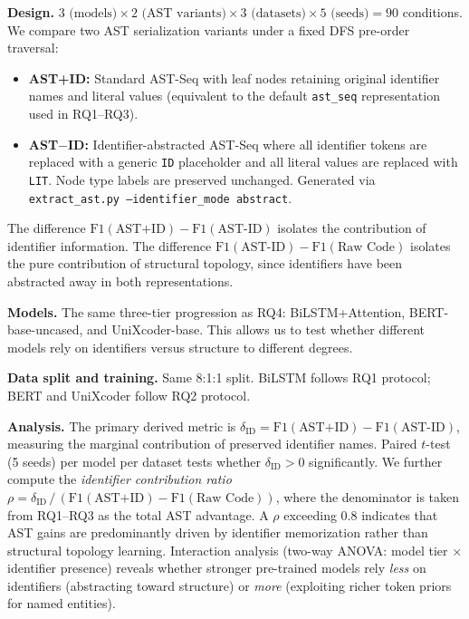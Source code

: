 \documentclass[pdflatex,sn-mathphys,Numbered]{sn-jnl}
\begin{document}
\textbf{Design.} $3 \text{ (models)} \times 2 \text{ (AST variants)} \times 3 \text{ (datasets)} \times 5 \text{ (seeds)} = 90$ conditions. We compare two AST serialization variants under a fixed DFS pre-order traversal:

\begin{itemize}
\item \textbf{AST+ID:} Standard AST-Seq with leaf nodes retaining original identifier names and literal values (equivalent to the default \texttt{ast\_seq} representation used in RQ1--RQ3).
\item \textbf{AST$-$ID:} Identifier-abstracted AST-Seq where all identifier tokens are replaced with a generic \texttt{ID} placeholder and all literal values are replaced with \texttt{LIT}. Node type labels are preserved unchanged. Generated via \texttt{extract\_ast.py --identifier\_mode abstract}.
\end{itemize}

The difference $\text{F1}(\text{AST+ID}) - \text{F1}(\text{AST-ID})$ isolates the contribution of identifier information. The difference $\text{F1}(\text{AST-ID}) - \text{F1}(\text{Raw Code})$ isolates the pure contribution of structural topology, since identifiers have been abstracted away in both representations.

\textbf{Models.} The same three-tier progression as RQ4: BiLSTM+Attention, BERT-base-uncased, and UniXcoder-base. This allows us to test whether different models rely on identifiers versus structure to different degrees.

\textbf{Data split and training.} Same 8:1:1 split. BiLSTM follows RQ1 protocol; BERT and UniXcoder follow RQ2 protocol.

\textbf{Analysis.} The primary derived metric is $\delta_{\text{ID}} = \text{F1}(\text{AST+ID}) - \text{F1}(\text{AST-ID})$, measuring the marginal contribution of preserved identifier names. Paired $t$-test (5 seeds) per model per dataset tests whether $\delta_{\text{ID}} > 0$ significantly. We further compute the \emph{identifier contribution ratio} $\rho = \delta_{\text{ID}} \,/\, (\text{F1}(\text{AST+ID}) - \text{F1}(\text{Raw Code}))$, where the denominator is taken from RQ1--RQ3 as the total AST advantage. A $\rho$ exceeding 0.8 indicates that AST gains are predominantly driven by identifier memorization rather than structural topology learning. Interaction analysis (two-way ANOVA: model tier $\times$ identifier presence) reveals whether stronger pre-trained models rely \emph{less} on identifiers (abstracting toward structure) or \emph{more} (exploiting richer token priors for named entities).
\end{document}
